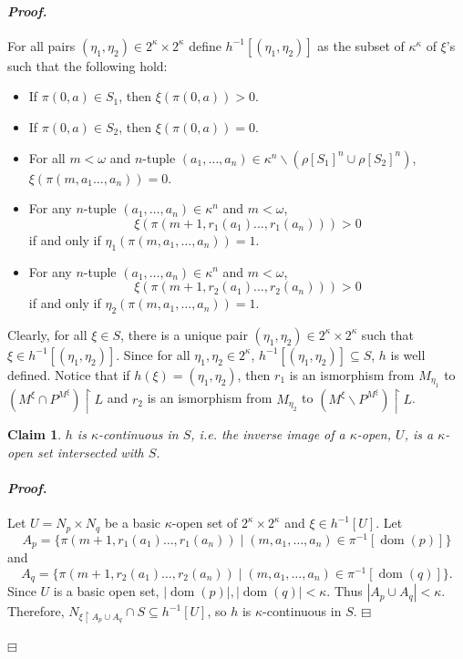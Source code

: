 \documentclass[12pt,a4paper]{amsart}
\newtheorem{claim}{Claim}[thm]
\theoremstyle{definition}
\theoremstyle{remark}
\DeclareMathOperator{\dom}{dom}
\renewcommand{\mid}{\mathrel{|}\allowbreak}
\renewcommand{\restriction}{\mathbin\upharpoonright}
\newenvironment{cproof}{\paragraph{\emph{Proof.\,}}}{\hfill{$\boxminus$}\par\vspace{2mm}}
\begin{document}
\begin{cproof}
For all pairs $(\eta_1,\eta_2)\in 2^\kappa\times 2^\kappa$ define $h^{-1}[(\eta_1,\eta_2)]$ as the subset of $\kappa^\kappa$ of $\xi$'s such that the following hold:
\begin{itemize}
    \item If $\pi(0,a)\in S_1$, then $\xi(\pi(0,a))>0$.
    \item If $\pi(0,a)\in S_2$, then $\xi(\pi(0,a))=0$.
    \item For all $m<\omega$ and $n$-tuple $(a_1,\ldots, a_n)\in \kappa^n\backslash (\rho[S_1]^n \cup \rho[S_2]^n)$, $\xi(\pi(m,a_1\ldots,a_n))=0$.
    \item For any $n$-tuple $(a_1,\ldots, a_n)\in \kappa^n$ and $m<\omega$, $$\xi(\pi(m+1,r_1(a_1)\ldots,r_1(a_n)))>0$$ if and only if $\eta_1(\pi(m,a_1,\ldots,a_n))=1$.
    \item For any $n$-tuple $(a_1,\ldots, a_n)\in \kappa^n$ and $m<\omega$, $$\xi(\pi(m+1,r_2(a_1)\ldots,r_2(a_n)))>0$$ if and only if $\eta_2(\pi(m,a_1,\ldots,a_n))=1$.
\end{itemize}

Clearly, for all $\xi\in S$, there is a unique pair $(\eta_1,\eta_2)\in 2^\kappa\times 2^\kappa$ such that $\xi\in h^{-1}[(\eta_1,\eta_2)]$. 
Since for all $\eta_1,\eta_2\in 2^\kappa$, $h^{-1}[(\eta_1,\eta_2)]\subseteq S$, $h$ is well defined. Notice that if $h(\xi)=(\eta_1,\eta_2)$, then $r_1$ is an ismorphism from $M_{\eta_1}$ to $(M^{\xi}\cap P^{M^{\xi}})\restriction L$ and $r_2$ is an ismorphism from $M_{\eta_2}$ to $(M^{\xi}\backslash P^{M^{\xi}})\restriction L$.


\begin{claim}
    $h$ is $\kappa$-continuous in $S$, i.e. the inverse image of a $\kappa$-open, $U$, is a $\kappa$-open set intersected with $S$.
\end{claim}
\begin{cproof}
    Let $U=N_p\times N_q$ be a basic $\kappa$-open set of $2^\kappa\times2^\kappa$ and $\xi\in h^{-1}[U]$. %
    Let $$A_p=\{\pi(m+1,r_1(a_1)\ldots,r_1(a_n))\mid (m,a_1,\ldots,a_n)\in \pi^{-1}[\dom(p)]\}$$ and $$A_q=\{\pi(m+1,r_2(a_1)\ldots,r_2(a_n))\mid (m,a_1,\ldots,a_n)\in \pi^{-1}[\dom(q)]\}.$$
    Since $U$ is a basic open set, $|\dom(p)|,|\dom(q)|<\kappa$. Thus $|A_p\cup A_q|<\kappa$. Therefore, $N_{\xi\restriction A_p\cup A_q}\cap S\subseteq h^{-1}[U]$, so $h$ is $\kappa$-continuous in $S$.
\end{cproof}


\end{cproof}
\end{document}
